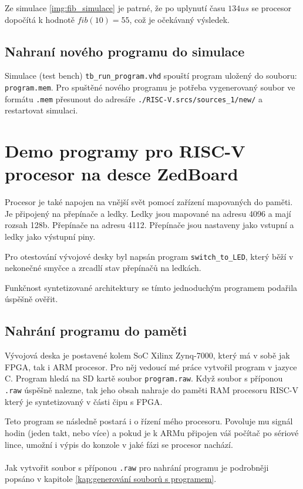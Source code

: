 \documentclass[FM,BP]{tulthesis}
\begin{document}
Ze simulace \ref{img:fib_simulace} je patrné, že po uplynutí času $134 us$ se procesor dopočítá k hodnotě $fib(10) = 55$, což je očekávaný výsledek. 

\subsection{Nahraní nového programu do simulace}
Simulace (test bench) \verb|tb_run_program.vhd| spouští program uložený do souboru: \verb|program.mem|. Pro spuštěné nového programu je potřeba vygenerovaný soubor ve formátu \verb|.mem| přesunout do adresáře \verb|./RISC-V.srcs/sources_1/new/| a restartovat simulaci.

\section{Demo programy pro RISC-V procesor na desce ZedBoard}
Procesor je také napojen na vnější svět pomocí zařízení mapovaných do paměti. Je připojený na přepínače a ledky. Ledky jsou mapované na adresu 4096 a mají rozsah 128b. Přepínače na adresu 4112. Přepínače jsou nastaveny jako vstupní a ledky jako výstupní piny. 

Pro otestování vývojové desky byl napsán program \verb|switch_to_LED|, který běží v nekonečné smyčce a zrcadlí stav přepínačů na ledkách.

Funkčnost syntetizované architektury se tímto jednoduchým programem podařila úspěšně ověřit.

\subsection{Nahrání programu do paměti}
Vývojová deska je postavené kolem SoC Xilinx Zynq-7000, který má v sobě jak FPGA, tak i ARM procesor. Pro něj vedoucí mé práce vytvořil program v jazyce C. Program hledá na SD kartě soubor \verb|program.raw|. Když soubor s příponou \verb|.raw| úspěšně nalezne, tak jeho obsah nahraje do paměti RAM procesoru RISC-V který je syntetizovaný v části čipu s FPGA. 

Teto program se následně postará i o řízení mého procesoru. Povoluje mu signál hodin (jeden takt, nebo více) a pokud je k ARMu připojen váš počítač po sériové lince, umožní i výpis do konzole v jaké fázi se procesor nachází. 

\paragraph{}
Jak vytvořit soubor s příponou \verb|.raw| pro nahrání programu je podrobněji popsáno v kapitole \ref{kap:generování souborů s programem}.
\end{document}
